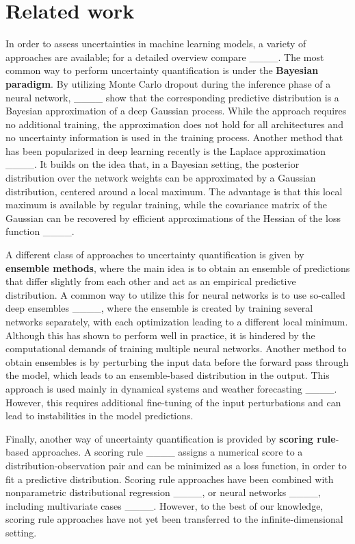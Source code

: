 \section{Related work}
In order to assess uncertainties in machine learning models, a variety of approaches are available; for a detailed overview compare ____. The most common way to perform uncertainty quantification is under the \textbf{Bayesian paradigm}. By utilizing Monte Carlo dropout during the inference phase of a neural network, ____ show that the corresponding predictive distribution is a Bayesian approximation of a deep Gaussian process. While the approach requires no additional training, the approximation does not hold for all architectures and no uncertainty information is used in the training process. Another method that has been popularized in deep learning recently is the Laplace approximation ____. It builds on the idea that, in a Bayesian setting, the posterior distribution over the network weights can be approximated by a Gaussian distribution, centered around a local maximum. The advantage is that this local maximum is available by regular training, while the covariance matrix of the Gaussian can be recovered by efficient approximations of the Hessian of the loss function ____. 

A different class of approaches to uncertainty quantification is given by \textbf{ensemble methods}, where the main idea is to obtain an ensemble of predictions that differ slightly from each other and act as an empirical predictive distribution. A common way to utilize this for neural networks is to use so-called deep ensembles ____, where the ensemble is created by training several networks separately, with each optimization leading to a different local minimum. Although this has shown to perform well in practice, it is hindered by the computational demands of training multiple neural networks. Another method to obtain ensembles is by perturbing the input data before the forward pass through the model, which leads to an ensemble-based distribution in the output. This approach is used mainly in dynamical systems and weather forecasting ____. However, this requires additional fine-tuning of the input perturbations and can lead to instabilities in the model predictions.

Finally, another way of uncertainty quantification is provided by \textbf{scoring rule}-based approaches. A scoring rule ____ assigns a numerical score to a distribution-observation pair and can be minimized as a loss function, in order to fit a predictive distribution. Scoring rule approaches have been combined with nonparametric distributional regression ____, or neural networks ____, including multivariate cases ____. However, to the best of our knowledge, scoring rule approaches have not yet been transferred to the infinite-dimensional setting.

